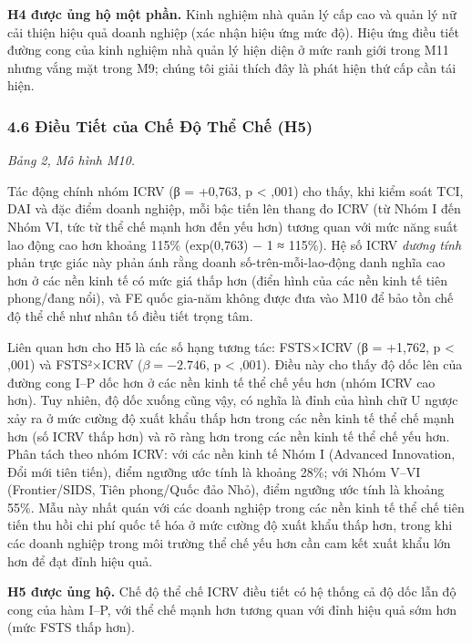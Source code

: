 \documentclass[12pt,a4paper]{article}
\begin{document}
\textbf{H4 được ủng hộ một phần.} Kinh nghiệm nhà quản lý cấp cao và
quản lý nữ cải thiện hiệu quả doanh nghiệp (xác nhận hiệu ứng mức độ).
Hiệu ứng điều tiết đường cong của kinh nghiệm nhà quản lý hiện diện ở
mức ranh giới trong M11 nhưng vắng mặt trong M9; chúng tôi giải thích
đây là phát hiện thứ cấp cần tái hiện.

\hypertarget{46-ux111iux1ec1u-tiux1ebft-cux1ee7a-chux1ebf-ux111ux1ed9-thux1ec3-chux1ebf-h5}{%
\subsubsection{4.6 Điều Tiết của Chế Độ Thể Chế
(H5)}\label{46-ux111iux1ec1u-tiux1ebft-cux1ee7a-chux1ebf-ux111ux1ed9-thux1ec3-chux1ebf-h5}}

\emph{Bảng 2, Mô hình M10.}

Tác động chính nhóm ICRV (β = +0,763, p \textless{} ,001) cho thấy, khi
kiểm soát TCI, DAI và đặc điểm doanh nghiệp, mỗi bậc tiến lên thang đo
ICRV (từ Nhóm I đến Nhóm VI, tức từ thể chế mạnh hơn đến yếu hơn) tương
quan với mức năng suất lao động cao hơn khoảng 115\% (exp(0,763) − 1 ≈
115\%). Hệ số ICRV \emph{dương tính} phản trực giác này phản ánh rằng
doanh số-trên-mỗi-lao-động danh nghĩa cao hơn ở các nền kinh tế có mức
giá thấp hơn (điển hình của các nền kinh tế tiên phong/đang nổi), và FE
quốc gia-năm không được đưa vào M10 để bảo tồn chế độ thể chế như nhân
tố điều tiết trọng tâm.

Liên quan hơn cho H5 là các số hạng tương tác: FSTS×ICRV (β = +1,762, p
\textless{} ,001) và FSTS²×ICRV (\(\beta = −2.746\), p \textless{}
,001). Điều này cho thấy độ dốc lên của đường cong I--P dốc hơn ở các
nền kinh tế thể chế yếu hơn (nhóm ICRV cao hơn). Tuy nhiên, độ dốc xuống
cũng vậy, có nghĩa là đỉnh của hình chữ U ngược xảy ra ở mức cường độ
xuất khẩu thấp hơn trong các nền kinh tế thể chế mạnh hơn (số ICRV thấp
hơn) và rõ ràng hơn trong các nền kinh tế thể chế yếu hơn. Phân tách
theo nhóm ICRV: với các nền kinh tế Nhóm I (Advanced Innovation, Đổi mới
tiên tiến), điểm ngưỡng ước tính là khoảng 28\%; với Nhóm V--VI
(Frontier/SIDS, Tiên phong/Quốc đảo Nhỏ), điểm ngưỡng ước tính là khoảng
55\%. Mẫu này nhất quán với các doanh nghiệp trong các nền kinh tế thể
chế tiên tiến thu hồi chi phí quốc tế hóa ở mức cường độ xuất khẩu thấp
hơn, trong khi các doanh nghiệp trong môi trường thể chế yếu hơn cần cam
kết xuất khẩu lớn hơn để đạt đỉnh hiệu quả.

\textbf{H5 được ủng hộ.} Chế độ thể chế ICRV điều tiết có hệ thống cả độ
dốc lẫn độ cong của hàm I--P, với thể chế mạnh hơn tương quan với đỉnh
hiệu quả sớm hơn (mức FSTS thấp hơn).
\end{document}
